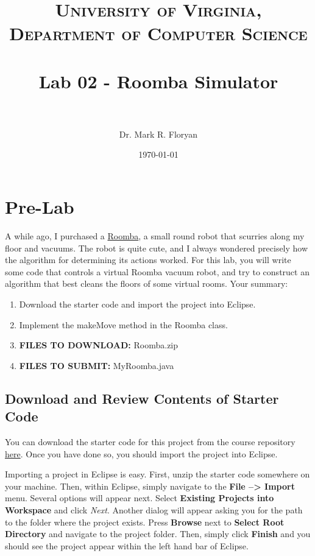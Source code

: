 \documentclass[paper=a4, fontsize=11pt, parskip=full]{scrartcl} %
\title{	
\normalfont \normalsize 
\textsc{University of Virginia, Department of Computer Science} \\ [25pt] %
\horrule{0.5pt} \\[0.4cm] %
\huge Lab 02 - Roomba Simulator \\ %
\horrule{2pt} \\[0.5cm] %
}
\author{Dr. Mark R. Floryan} %
\date{\normalsize\today} %
\numberwithin{equation}{section} %
\numberwithin{figure}{section} %
\numberwithin{table}{section} %
\begin{document}
\maketitle %


\section{Pre-Lab}

A while ago, I purchased a \href{https://www.irobot.com/For-the-Home/Vacuuming/Roomba.aspx}{Roomba}, a small round robot that scurries along my floor and vacuums. The robot is quite cute, and I always wondered precisely how the algorithm for determining its actions worked. For this lab, you will write some code that controls a virtual Roomba vacuum robot, and try to construct an algorithm that best cleans the floors of some virtual rooms. Your summary:

\begin{enumerate}
	\item Download the starter code and import the project into Eclipse.
	\item Implement the makeMove method in the Roomba class.
	\item \textbf{FILES TO DOWNLOAD:} Roomba.zip
	\item \textbf{FILES TO SUBMIT:} MyRoomba.java
\end{enumerate}


\subsection{Download and Review Contents of Starter Code}

You can download the starter code for this project from the course repository \href{https://github.com/markfloryan/dsa1}{here}. Once you have done so, you should import the project into Eclipse.

Importing a project in Eclipse is easy. First, unzip the starter code somewhere on your machine. Then, within Eclipse, simply navigate to the \textbf{File --> Import} menu. Several options will appear next. Select \textbf{Existing Projects into Workspace} and click \emph{Next}. Another dialog will appear asking you for the path to the folder where the project exists. Press \textbf{Browse} next to \textbf{Select Root Directory} and navigate to the project folder. Then, simply click \textbf{Finish} and you should see the project appear within the left hand bar of Eclipse.
\end{document}
